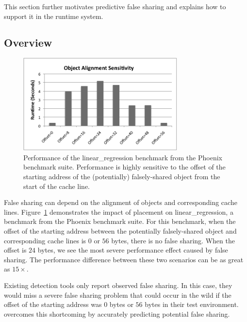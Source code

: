 \label{sec:prediction}
This section further motivates predictive false sharing and explains how to support it in the runtime system.  

\subsection{Overview}
\label{sec:predictoverview}

\begin{figure}[!t]
\begin{center}
\vspace{1.2em}
\includegraphics[width=3.3in]{fig/perfsensitive}
\vspace{1.2em}
\end{center}
\caption{
Performance of the linear\_regression benchmark from the Phoenix benchmark suite.
Performance is highly sensitive to the offset of the starting address of the (potentially) falsely-shared object 
from the start of the cache line. 
\label{fig:perfsensitive}}
\end{figure}

False sharing can depend on 
the alignment of objects and corresponding cache lines.
Figure~\ref{fig:perfsensitive} demonstrates the impact of placement on linear\_regression, a benchmark from the Phoenix benchmark suite.
For this benchmark,
when the offset of the starting address between the potentially falsely-shared object and corresponding cache lines 
is $0$ or $56$ bytes, 
there is no false sharing. 
When the offset is $24$ bytes, we see the most severe performance effect caused 
by false sharing. 
The performance difference between these two scenarios can be as great as $15\times$.
 
Existing detection tools only report observed false sharing.
In this case, they would miss a severe false sharing problem that could occur in the wild if the offset of the starting 
address was $0$ bytes or $56$ bytes in their test environment.
\Predator{} overcomes this shortcoming by accurately predicting potential false sharing.

